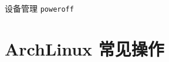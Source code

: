 \documentclass{ctexart}
\begin{document}
\begin{mybox}{设备管理}
    \texttt{poweroff}
\end{mybox}

\clearpage
\section{ArchLinux 常见操作}






\end{document}

